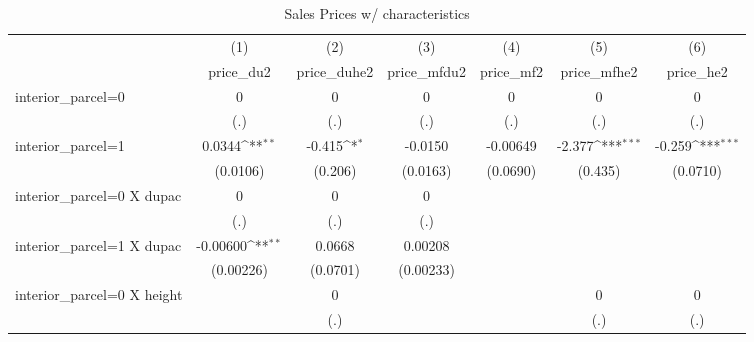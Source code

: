 \begin{table}[htbp]\centering
\def\sym#1{\ifmmode^{#1}\else\(^{#1}\)\fi}
\caption{Sales Prices w/ characteristics}
\begin{tabular}{l*{6}{c}}
\hline\hline
                    &\multicolumn{1}{c}{(1)}&\multicolumn{1}{c}{(2)}&\multicolumn{1}{c}{(3)}&\multicolumn{1}{c}{(4)}&\multicolumn{1}{c}{(5)}&\multicolumn{1}{c}{(6)}\\
                    &\multicolumn{1}{c}{price\_du2}&\multicolumn{1}{c}{price\_duhe2}&\multicolumn{1}{c}{price\_mfdu2}&\multicolumn{1}{c}{price\_mf2}&\multicolumn{1}{c}{price\_mfhe2}&\multicolumn{1}{c}{price\_he2}\\
\hline
interior\_parcel=0   &           0         &           0         &           0         &           0         &           0         &           0         \\
                    &         (.)         &         (.)         &         (.)         &         (.)         &         (.)         &         (.)         \\
[1em]
interior\_parcel=1   &      0.0344\sym{**} &      -0.415\sym{*}  &     -0.0150         &    -0.00649         &      -2.377\sym{***}&      -0.259\sym{***}\\
                    &    (0.0106)         &     (0.206)         &    (0.0163)         &    (0.0690)         &     (0.435)         &    (0.0710)         \\
[1em]
interior\_parcel=0 X dupac&           0         &           0         &           0         &                     &                     &                     \\
                    &         (.)         &         (.)         &         (.)         &                     &                     &                     \\
[1em]
interior\_parcel=1 X dupac&    -0.00600\sym{**} &      0.0668         &     0.00208         &                     &                     &                     \\
                    &   (0.00226)         &    (0.0701)         &   (0.00233)         &                     &                     &                     \\
[1em]
interior\_parcel=0 X height&                     &           0         &                     &                     &           0         &           0         \\
                    &                     &         (.)         &                     &                     &         (.)         &         (.)         \\

\end{tabular}
\end{table}
